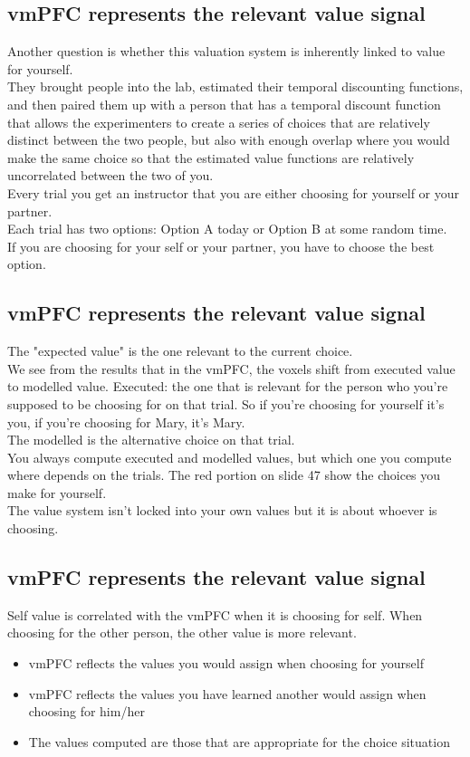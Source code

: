 \subsection{vmPFC represents the relevant value signal}
Another question is whether this valuation system is inherently linked to value for yourself.
\\They brought people into the lab, estimated their temporal discounting functions, and then paired them up with a person that has a temporal discount function that allows the experimenters to create a series of choices that are relatively distinct between the two people, but also with enough overlap where you would make the same choice so that the estimated value functions are relatively uncorrelated between the two of you. 
\\Every trial you get an instructor that you are either choosing for yourself or your partner.
\\Each trial has two options: Option A today or Option B at some random time.
\\If you are choosing for your self or your partner, you have to choose the best option.

\subsection{vmPFC represents the relevant value signal}
The "expected value" is the one relevant to the current choice.
\\We see from the results that in the vmPFC, the voxels shift from executed value to modelled value. Executed: the one that is relevant for the person who you're supposed to be choosing for on that trial. So if you're choosing for yourself it's you, if you're choosing for Mary, it's Mary. 
\\The modelled is the alternative choice on that trial.
\\You always compute executed and modelled values, but which one you compute where depends on the trials. The red portion on slide 47 show the choices you make for yourself. 
\\The value system isn't locked into your own values but it is about whoever is choosing.
\subsection{vmPFC represents the relevant value signal}
Self value is correlated with the vmPFC when it is choosing for self. When choosing for the other person, the other value is more relevant.
\begin{itemize}
    \item vmPFC reflects the values you would assign when choosing for yourself
    \item vmPFC reflects the values you have learned another would assign when choosing for him/her
    \item The values computed are those that are appropriate for the choice situation
    
\end{itemize}
